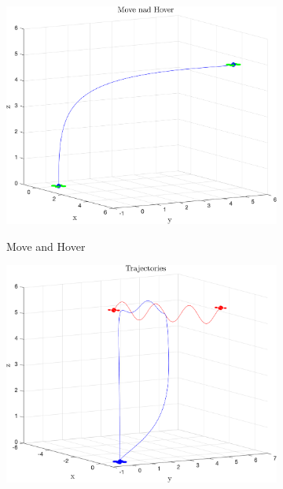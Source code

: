 \documentclass{article}
\begin{document}
\begin{multicols}{2}
\begin{figure}[H]
\centering
\begin{subfigure}[b]{0.45\columnwidth}
    \centering
    \includegraphics[width = 1\textwidth]{images/MoveAndHover.png}
     \label{fig:MandH}
     \vspace{-5mm}
     \caption{Move and Hover}
\end{subfigure}
\begin{subfigure}[b]{0.45\columnwidth}
    \centering
    \includegraphics[width = 1\textwidth]{images/ReturnToBase.png}
     \label{fig:Return}
     \vspace{-5mm}

\end{subfigure}
\end{figure}
\end{multicols}
\end{document}

